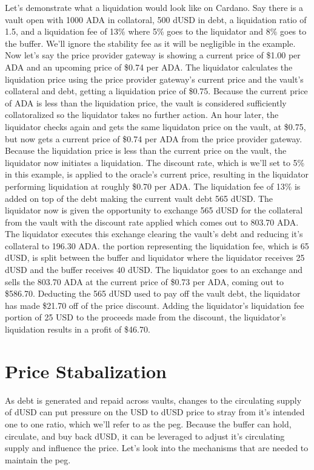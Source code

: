 \documentclass[12pt]{article}
\begin{document}
Let's demonstrate what a liquidation would look like on Cardano. Say there is a vault open with 1000 ADA in collatoral, 500 dUSD in debt, a liquidation ratio of 1.5, and a liquidation fee of 13\% where 5\% goes to the liquidator and 8\% goes to the buffer. We'll ignore the stability fee as it will be negligible in the example. Now let's say the price provider gateway is showing a current price of \$1.00 per ADA and an upcoming price of \$0.74 per ADA. The liquidator calculates the liquidation price using the price provider gateway's current price and the vault's collateral and debt, getting a liquidation price of \$0.75. Because the current price of ADA is less than the liquidation price, the vault is considered sufficiently collatoralized so the liquidator takes no further action. An hour later, the liquidator checks again and gets the same liquidaton price on the vault, at \$0.75, but now gets a current price of \$0.74 per ADA from the price provider gateway. Because the liquidation price is less than the current price on the vault, the liquidator now initiates a liquidation. The discount rate, which is we'll set to 5\% in this example, is applied to the oracle's current price, resulting in the liquidator performing liquidation at roughly \$0.70 per ADA. The liquidation fee of 13\% is added on top of the debt making the current vault debt 565 dUSD. The liquidator now is given the opportunity to exchange 565 dUSD for the collateral from the vault with the discount rate applied which comes out to 803.70 ADA. The liquidator executes this exchange clearing the vault's debt and reducing it's collateral to 196.30 ADA. the portion representing the liquidation fee, which is 65 dUSD, is split between the buffer and liquidator where the liquidator receives 25 dUSD and the buffer receives 40 dUSD. The liquidator goes to an exchange and sells the 803.70 ADA at the current price of \$0.73 per ADA, coming out to \$586.70. Deducting the 565 dUSD used to pay off the vault debt, the liquidator has made \$21.70 off of the price discount. Adding the liquidator's liquidation fee portion of 25 USD to the proceeds made from the discount, the liquidator's liquidation results in a profit of \$46.70.

\section{Price Stabalization}

As debt is generated and repaid across vaults, changes to the circulating supply of dUSD can put pressure on the USD to dUSD price to stray from it's intended one to one ratio, which we'll refer to as the peg. Because the buffer can hold, circulate, and buy back dUSD, it can be leveraged to adjust it's circulating supply and influence the price. Let's look into the mechanisms that are needed to maintain the peg.
\end{document}
